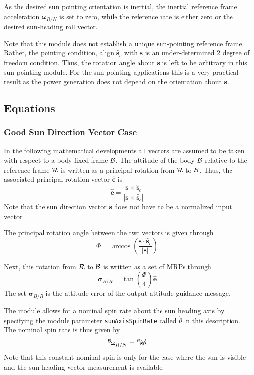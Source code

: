 As the desired sun pointing orientation is inertial, the inertial reference frame  acceleration $\dot{\bm\omega}_{R/N}$ is set to zero, while the reference rate is either zero or the desired sun-heading roll vector.  

Note that this module does not establish a unique sun-pointing reference frame.  Rather, the pointing condition, align $\hat{\bm s}_{c}$ with $\bm s$ is an under-determined 2 degree of freedom condition.  Thus, the rotation angle about $\bm s$ is left to be arbitrary in this sun pointing module.  For the sun pointing applications this is a very practical result as the power generation does not depend on the orientation about $\bm s$.  



\subsection{Equations}
\subsubsection{Good Sun Direction Vector Case}\label{sec:withSun}
In the following mathematical developments all vectors are assumed to be taken with respect to a body-fixed frame $\cal B$.  The attitude of the body $\cal B$ relative to the reference frame $\cal R$ is written as a principal rotation from $\cal R$ to $\cal B$.  Thus, the associated principal rotation vector $\hat{\bm e}$ is
\begin{equation}
	\label{eq:ssp:1}
	\hat{\bm e} = \frac{\bm s \times \hat{\bm s}_{c}}{|\bm s \times \hat{\bm s}_{c}|}
\end{equation}
Note that the sun direction vector $\bm s$ does not have to be a normalized input vector.  

The principal rotation angle between the two vectors is given through
\begin{equation}
	\label{eq:ssp:2}
	\Phi = \arccos \left( \frac{\bm s  \cdot \hat{\bm s}_{c} }{|\bm s|} \right)
\end{equation}

Next, this rotation from $\cal R$ to $\cal B$ is written as a set of MRPs through
\begin{equation}
	\label{eq:ssp:3}
	\bm\sigma_{B/R} = \tan\left(\frac{\Phi}{4}\right) \hat{\bm e}
\end{equation}
The set $\bm\sigma_{B/R}$ is the attitude error of the output attitude guidance message.  

The module allows for a nominal spin rate about the sun heading axis by specifying the module parameter {\tt sunAxisSpinRate} called $\dot \theta$ in this description.  The nominal spin rate is thus given by
\begin{equation}
	\leftexp{B}{\bm\omega}_{R/N} = \leftexp{B}{\hat{\bm s}} \dot\theta
\end{equation}
Note that this constant nominal spin is only for the case where the sun is visible and the sun-heading vector measurement is available. 

